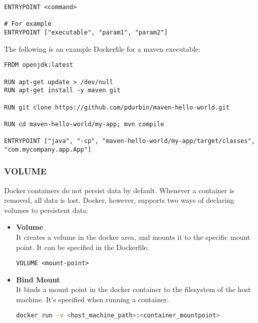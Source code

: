 \documentclass{article}
\begin{document}
\begin{lstlisting}[language=docker,breaklines=true,label={code:compose}]
ENTRYPOINT <command>

# For example
ENTRYPOINT ["executable", "param1", "param2"]
\end{lstlisting}
\vspace{.4cm}
The following is an example Dockerfile for a maven executable: \\

\begin{lstlisting}[language=docker,breaklines=true,label={code:compose}]
FROM openjdk:latest

RUN apt-get update > /dev/null
RUN apt-get install -y maven git

RUN git clone https://github.com/pdurbin/maven-hello-world.git

RUN cd maven-hello-world/my-app; mvn compile

ENTRYPOINT ["java", "-cp", "maven-hello-world/my-app/target/classes", "com.mycompany.app.App"]
\end{lstlisting}

\subsubsection{VOLUME}
Docker containers do not persist data by default. Whenever a container is removed, all data is lost. Docker, however, supports two ways of declaring volumes to persistent data:

\begin{itemize}
	\item \textbf{Volume}
	\vspace{.2cm} \\
	It creates a volume in the docker area, and mounts it to the specific mount point. It can be specified in the Dockerfile. \\
	
	\begin{lstlisting}[language=docker,breaklines=true,label={code:compose}]
VOLUME <mount-point>
	\end{lstlisting}
	
	\item \textbf{Bind Mount}
	\vspace{.2cm} \\
	It binds a mount point in the docker container to the filesystem of the host machine. It's specified when running a container. \\
	
	\begin{lstlisting}[language=bash,breaklines=true,label={code:compose}]
docker run -v <host_machine_path>:<container_mountpoint>
	\end{lstlisting}
\end{itemize}
\end{document}
